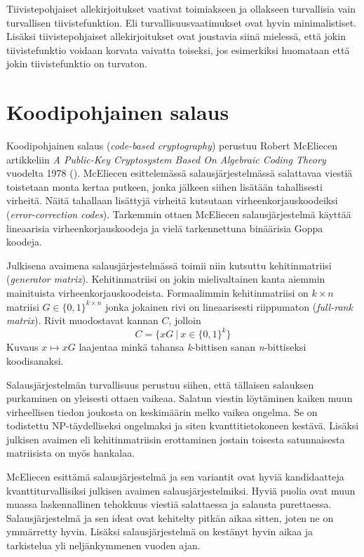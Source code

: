 Tiivistepohjaiset allekirjoitukset vaativat toimiakseen ja ollakseen turvallisia vain turvallisen tiivistefunktion. Eli turvallisuusvaatimukset ovat hyvin minimalistiset. Lisäksi tiivistepohjaiset allekirjoitukset ovat joustavia siinä mielessä, että jokin tiivistefunktio voidaan korvata vaivatta toiseksi, jos esimerkiksi huomataan että jokin tiivistefunktio on turvaton.

\section{Koodipohjainen salaus}
Koodipohjainen salaus (\emph{code-based cryptography}) perustuu Robert McEliecen artikkeliin \emph{A Public-Key Cryptosystem Based On Algebraic Coding Theory} vuodelta 1978 (\cite{8012331}). McEliecen esittelemässä salausjärjestelmässä salattavaa viestiä toistetaan monta kertaa putkeen, jonka jälkeen siihen lisätään tahallisesti virheitä. Näitä tahallaan lisättyjä virheitä kutsutaan virheenkorjauskoodeiksi (\emph{error-correction codes}). Tarkemmin ottaen McEliecen salausjärjestelmä käyttää lineaarisia virheenkorjauskoodeja ja vielä tarkennettuna binäärisia Goppa koodeja.

Julkisena avaimena salausjärjestelmässä toimii niin kutsuttu kehitinmatriisi (\emph{generator matrix}). Kehitinmatriisi on jokin mielivaltainen kanta aiemmin mainituista virheenkorjauskoodeista. Formaalimmin kehitinmatriisi on $k \times n$ matriisi $G \in \big\{0,1\big\}^{k \times n}$ jonka jokainen rivi on lineaarisesti riippumaton (\emph{full-rank matrix}). Rivit muodostavat kannan $C$, jolloin 
\[C = \big\{ xG \: | \: x \in \big\{0,1\big\}^k \big\}\]
Kuvaus $x \mapsto xG$ laajentaa minkä tahansa \emph{k}-bittisen sanan \emph{n}-bittiseksi koodisanaksi.

Salausjärjestelmän turvallisuus perustuu siihen, että tällaisen salauksen purkaminen on yleisesti ottaen vaikeaa. Salatun viestin löytäminen kaiken muun virheellisen tiedon joukosta on keskimäärin melko vaikea ongelma. Se on todistettu NP-täydelliseksi ongelmaksi ja siten kvanttitietokoneen kestävä. Lisäksi julkisen avaimen eli kehitinmatriisin erottaminen jostain toisesta satunnaisesta matriisista on myös hankalaa.

McEliecen esittämä salausjärjestelmä ja sen variantit ovat hyviä kandidaatteja kvanttiturvallisiksi julkisen avaimen salausjärjestelmiksi. Hyviä puolia ovat muun muassa laskennallinen tehokkuus viestiä salattaessa ja salausta purettaessa. Salausjärjestelmä ja sen ideat ovat kehitelty pitkän aikaa sitten, joten ne on ymmärretty hyvin. Lisäksi salausjärjestelmä on kestänyt hyvin aikaa ja tarkistelua yli neljänkymmenen vuoden ajan.

